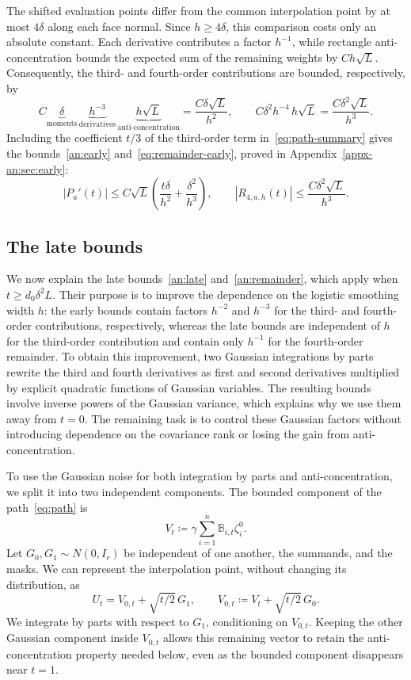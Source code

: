 \documentclass[11pt,letterpaper]{article}
\theoremstyle{remark}
\begin{document}
The shifted evaluation points differ from the common interpolation
point by at most \(4\delta\) along each face normal. Since
\(h\ge4\delta\), this comparison costs only an absolute constant.
Each derivative contributes a factor \(h^{-1}\), while rectangle
anti-concentration bounds the expected sum of the remaining weights
by \(Ch\sqrt L\).
Consequently, the third- and fourth-order contributions are bounded,
respectively, by
\[
 C\underbrace{\delta}_{\text{moments}}\,
  \underbrace{h^{-3}}_{\text{derivatives}}\,
  \underbrace{h\sqrt L}_{\text{anti-concentration}}
  =\frac{C\delta\sqrt L}{h^2},
 \qquad
 C\delta^2h^{-4}\,h\sqrt L=\frac{C\delta^2\sqrt L}{h^3}.
\]
Including the coefficient \(t/3\) of the third-order term
in~\eqref{eq:path-summary} gives the bounds~\eqref{an:early}
and~\eqref{eq:remainder-early}, proved in
Appendix~\ref{appx-an:sec:early}:
\[
 |P_a'(t)|\le C\sqrt L
   \left(\frac{t\delta}{h^2}+\frac{\delta^2}{h^3}\right),
 \qquad
 |R_{4,a,h}(t)|\le\frac{C\delta^2\sqrt L}{h^3}.
\]
\subsection{The late bounds}
\label{sec:outline-late}

We now explain the late bounds~\eqref{an:late} and~\eqref{an:remainder},
which apply when \(t\ge d_0\delta^2L\). Their purpose is to improve
the dependence on the logistic smoothing width \(h\): the early bounds
contain factors \(h^{-2}\) and \(h^{-3}\) for the third- and fourth-order
contributions, respectively, whereas the late bounds are independent
of \(h\) for the third-order contribution and contain only \(h^{-1}\)
for the fourth-order remainder. To obtain this improvement, two
Gaussian integrations by parts rewrite the third and fourth
derivatives as first and second derivatives multiplied by explicit
quadratic functions of Gaussian variables. The resulting bounds
involve inverse powers of the Gaussian variance, which explains why
we use them away from \(t=0\). The remaining task is to control these
Gaussian factors without introducing dependence on the covariance
rank or losing the gain from anti-concentration.

To use the Gaussian noise for both integration by parts and
anti-concentration, we split it into two independent components.
The bounded component of the path~\eqref{eq:path} is
\[
 V_t\coloneqq\gamma\sum_{i=1}^n\mathbb B_{i,t}\zeta_i^0.
\]
Let \(G_0,G_1\sim N(0,I_r)\) be independent of one another, the
summands, and the masks. We can represent the interpolation point,
without changing its distribution, as
\[
 U_t=V_{0,t}+\sqrt{t/2}\,G_1,
 \qquad V_{0,t}\coloneqq V_t+\sqrt{t/2}\,G_0.
\]
We integrate by parts with respect to \(G_1\), conditioning on
\(V_{0,t}\). Keeping the other Gaussian component inside \(V_{0,t}\)
allows this remaining vector to retain the anti-concentration
property needed below, even as the bounded component disappears
near \(t=1\).
\end{document}
